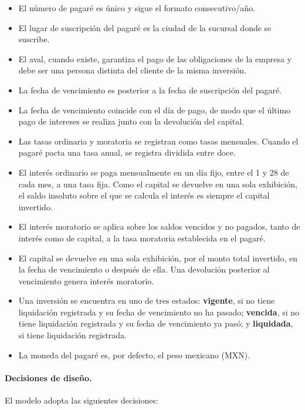 \begin{itemize}[leftmargin=*]
	\item El n\'umero de pagar\'e es \'unico y sigue el formato consecutivo/año.
	\item El lugar de suscripci\'on del pagar\'e es la ciudad de la sucursal donde se suscribe.
	\item El aval, cuando existe, garantiza el pago de las obligaciones de la empresa y debe ser una persona distinta del cliente de la misma inversi\'on.
	\item La fecha de vencimiento es posterior a la fecha de suscripci\'on del pagar\'e.
	\item La fecha de vencimiento coincide con el día de pago, de modo que el último pago de intereses se realiza junto con la devolución del capital.
	\item Las tasas ordinaria y moratoria se registran como tasas mensuales. Cuando el pagar\'e pacta una tasa anual, se registra dividida entre doce.
	\item El inter\'es ordinario se paga mensualmente en un d\'ia fijo, entre el 1 y 28 de cada mes, a una tasa fija. Como el capital se devuelve en una sola exhibici\'on, el saldo insoluto sobre el que se calcula el inter\'es es siempre el capital invertido.
	\item El inter\'es moratorio se aplica sobre los saldos vencidos y no pagados, tanto de inter\'es como de capital, a la tasa moratoria establecida en el pagar\'e.
	\item El capital se devuelve en una sola exhibici\'on, por el monto total invertido, en la fecha de vencimiento o despu\'es de ella. Una devoluci\'on posterior al vencimiento genera inter\'es moratorio.
	\item Una inversi\'on se encuentra en uno de tres estados: \textbf{vigente}, si no tiene liquidaci\'on registrada y su fecha de vencimiento no ha pasado; \textbf{vencida}, si no tiene liquidaci\'on registrada y su fecha de vencimiento ya pas\'o; y \textbf{liquidada}, si tiene liquidaci\'on registrada.
	\item La moneda del pagar\'e es, por defecto, el peso mexicano (MXN).
\end{itemize}

\paragraph{Decisiones de diseño.} El modelo adopta las siguientes decisiones:

